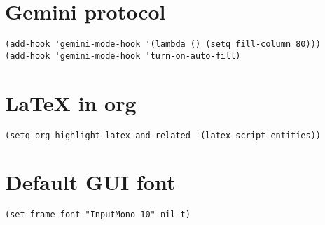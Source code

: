 \documentclass[11pt]{article}
\begin{document}
\section{Gemini protocol}
\label{sec:orga030c4d}
\begin{verbatim}
(add-hook 'gemini-mode-hook '(lambda () (setq fill-column 80)))
(add-hook 'gemini-mode-hook 'turn-on-auto-fill)
\end{verbatim}
\section{\LaTeX{} in org}
\label{sec:org7c79d5f}
\begin{verbatim}
(setq org-highlight-latex-and-related '(latex script entities))
\end{verbatim}
\section{Default GUI font}
\label{sec:org4343666}
\begin{verbatim}
(set-frame-font "InputMono 10" nil t)
\end{verbatim}
\end{document}

